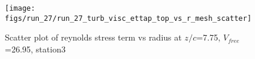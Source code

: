 \begin{figure}[H]
\centering
\texttt{[image: figs/run\_27/run\_27\_turb\_visc\_ettap\_top\_vs\_r\_mesh\_scatter]}
\caption{Scatter plot of reynolds stress term vs radius at $z/c$=7.75, $V_{free}$=26.95, station3}
\label{fig:run_27_turb_visc_ettap_top_vs_r_mesh_scatter}
\end{figure}


